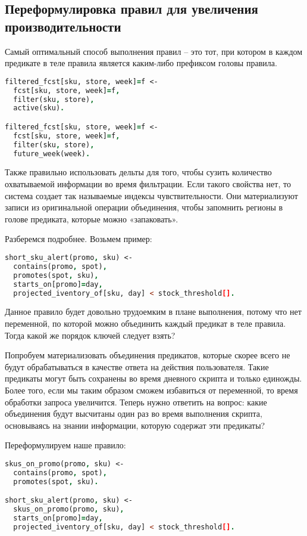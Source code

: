 \subsection{Переформулировка правил для увеличения производительности}
\label{sec:optimization:data_repr:rule_split}

Самый оптимальный способ выполнения правил – это тот, при котором в каждом предикате в теле правила является каким-либо префиксом головы правила.

\begin{lstlisting}[language=Prolog]
filtered_fcst[sku, store, week]=f <-
  fcst[sku, store, week]=f,
  filter(sku, store),
  active(sku).

filtered_fcst[sku, store, week]=f <-
  fcst[sku, store, week]=f,
  filter(sku, store),
  future_week(week).
\end{lstlisting}

Также правильно использовать дельты для того, чтобы сузить количество охватываемой информации во время фильтрации. Если такого свойства нет, то система создает так называемые индексы чувствительности. Они материализуют записи из оригинальной операции объединения, чтобы запомнить регионы в голове предиката, которые можно «запаковать».

Разберемся подробнее. Возьмем пример:

\begin{lstlisting}[language=Prolog]
short_sku_alert(promo, sku) <-
  contains(promo, spot),
  promotes(spot, sku),
  starts_on[promo]=day,
  projected_iventory_of[sku, day] < stock_threshold[].
\end{lstlisting}

Данное правило будет довольно трудоемким в плане выполнения, потому что нет переменной, по которой можно объединить каждый предикат в теле правила. Тогда какой же порядок ключей следует взять?

Попробуем материализовать объединения предикатов, которые скорее всего не будут обрабатываться в качестве ответа на действия пользователя. Такие предикаты могут быть сохранены во время дневного скрипта и только единожды. Более того, если мы таким образом сможем избавиться от переменной, то время обработки запроса увеличится. Теперь нужно ответить на вопрос: какие объединения будут высчитаны один раз во время выполнения скрипта, основываясь на знании информации, которую содержат эти предикаты?

Переформулируем наше правило:

\begin{lstlisting}[language=Prolog]
skus_on_promo(promo, sku) <-
  contains(promo, spot),
  promotes(spot, sku).

short_sku_alert(promo, sku) <-
  skus_on_promo(promo, sku),
  starts_on[promo]=day,
  projected_iventory_of[sku, day] < stock_threshold[].
\end{lstlisting}

